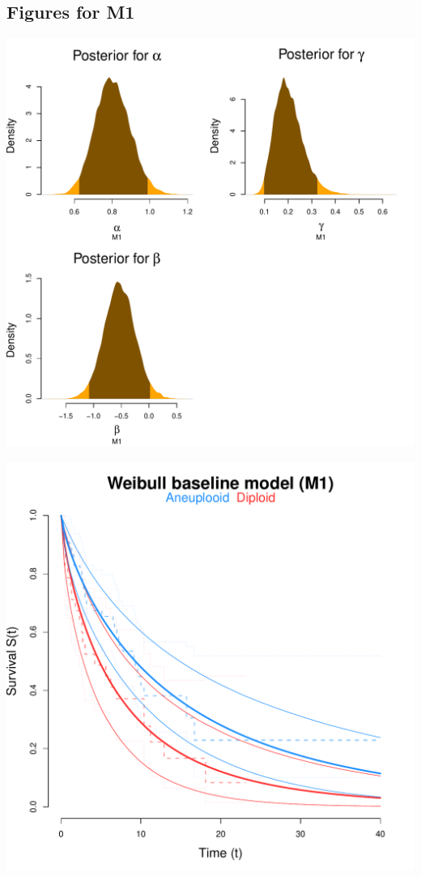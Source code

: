 \documentclass[12pt]{article}
\begin{document}
\subsection*{Figures for M1}
\begin{center}
\includegraphics[scale=0.647]{figs/m1_post.pdf}
\bigskip
\bigskip

\includegraphics[scale=0.45]{figs/m1_surv.pdf}
\end{center}
\end{document}
